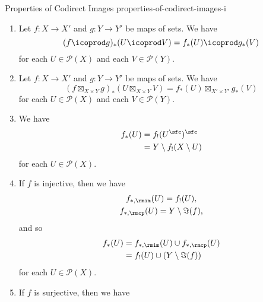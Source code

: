 \begin{proposition}{Properties of Codirect Images \rmI}{properties-of-codirect-images-i}
\begin{enumerate}
\[\begin{gathered}
                \end{gathered}
            \]%
            natural in $U,V\in\mathcal{P}(X)$.
        \item\label{properties-of-codirect-images-i-interaction-with-coproducts}Let $f\colon X\to X'$ and $g\colon Y\to Y'$ be maps of sets. We have
            \[
                (f\icoprod g)_{*}(U\icoprod V)%
                =%
                f_{*}(U)\icoprod g_{*}(V)%
            \]%
            for each $U\in\mathcal{P}(X)$ and each $V\in\mathcal{P}(Y)$.
        \item\label{properties-of-codirect-images-i-interaction-with-products}Let $f\colon X\to X'$ and $g\colon Y\to Y'$ be maps of sets. We have
            \[
                (f\boxtimes_{X\times Y} g)_{*}(U\boxtimes_{X\times Y}V)%
                =%
                f_{*}(U)\boxtimes_{X'\times Y'}g_{*}(V)%
            \]%
            for each $U\in\mathcal{P}(X)$ and each $V\in\mathcal{P}(Y)$.
        \item\label{properties-of-codirect-images-i-relation-to-direct-images}We have
            \begin{align*}
                f_{*}(U) &= f_{!}(U^{\sfc})^{\sfc}\\
                         &= Y\setminus f_{!}(X\setminus U)
            \end{align*}
            for each $U\in\mathcal{P}(X)$.
        \item\label{properties-of-codirect-images-i-interaction-with-injections}If $f$ is injective, then we have
            \begin{gather*}
                f_{*,\rmim}(U) = f_{!}(U),\\
                f_{*,\rmcp}(U) = Y\setminus\Im(f),\\
            \end{gather*}
            and so
            \begin{align*}
                f_{*}(U) &= f_{*,\rmim}(U)\cup f_{*,\rmcp}(U)\\
                         &= f_{!}(U)\cup(Y\setminus\Im(f))
            \end{align*}
            for each $U\in\mathcal{P}(X)$.
        \item\label{properties-of-codirect-images-i-interaction-with-surjections}If $f$ is surjective, then we have

\end{enumerate}
\end{proposition}
